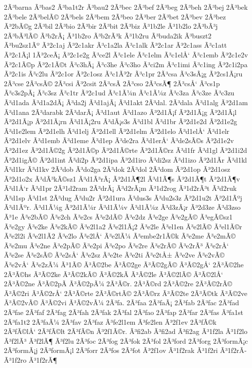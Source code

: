 {2Ã³barna
Ã³bas2
Ã³ba1t2r
Ã³bau2
2Ã³bec
2Ã³bef
2Ã³beg
2Ã³beh
2Ã³bej
2Ã³bek
2Ã³bele
2Ã³belÃ©
2Ã³bels
2Ã³bem
2Ã³beo
2Ã³ber
2Ã³bet
2Ã³bev
2Ã³bez
Ã³2bÃ©g
2Ã³bil
2Ã³bio
2Ã³bir
2Ã³bit
2Ã³biz
Ã³1b2le
Ã³1b2lo
2Ã³bÃ³j
2Ã³bÃ³lÃ©
Ã³b2rÃ¡
Ã³1b2ro
Ã³b2rÃ³k
Ã³1b2ru
Ã³buda2ik
Ã³buszt2
Ã³bu2sz1Ãº
Ã³2c1aj
Ã³2c1akr
Ã³c1a2la
Ã³c1alk
Ã³2c1ar
Ã³2c1ass
Ã³c1att
Ã³2c1Ã¡l
1Ã³2ceÃ¡
Ã³2c1e2g
Ã³ce2l
Ã³c1ele
Ã³c1elm
Ã³c1elÅ‘
Ã³c1emb
Ã³2c1e2v
Ã³2c1Ã©p
Ã³2c1Ã©t
Ã³c3hÃ¡
Ã³c3he
Ã³c3ho
Ã³ci2m
Ã³c1imi
Ã³c1ing
Ã³2c1i2pa
Ã³2c1is
Ã³c2lu
Ã³2c1or
Ã³2c1osz
Ã³c1Ã³2r
Ã³c1pr
2Ã³csa
Ã³c3sÃ¡g
Ã³2cs1Ã¡ru
2Ã³cse
2Ã³csÃ©
2Ã³csi
Ã³2csit
2Ã³csÃ­
2Ã³cso
2Ã³csÃ¶
2Ã³csÅ‘
Ã³cs1p
Ã³c3s2pÃ¡
Ã³c3sz
Ã³c1tr
Ã³2c1ud
Ã³c1Ã¼n
Ã³c1Ã¼z
Ã³c3za
Ã³c3ze
Ã³c3zu
Ã³d1ada
Ã³d1a2dÃ¡
Ã³da2j
Ã³d1ajÃ¡
Ã³d1akt
2Ã³dal.
2Ã³dala
Ã³d1alg
Ã³2d1am
Ã³d1ana
2Ã³darabk
2Ã³darÃ¡
Ã³d1aut
Ã³d1azo
Ã³2d1Ã¡f
Ã³2d1Ã¡g
Ã³2d1Ã¡l
Ã³2d1Ã¡p
Ã³2d1Ã¡rn
Ã³d1Ã¡2ru
Ã³dÃ¡s3s
Ã³d1bl
Ã³d1br
Ã³2d1e2d
Ã³2d1e2g
Ã³d1e2lem
Ã³2d1elh
Ã³d1elj
Ã³2d1ell
Ã³2d1elm
Ã³2d1elo
Ã³d1elÅ‘
Ã³d1elr
Ã³2d1elv
Ã³d1emb
Ã³d1eme
Ã³d1ep
Ã³de2ra
Ã³d1erÅ‘
Ã³de2sÃ©s
Ã³2d1e2v
Ã³2d1ez
Ã³2d1Ã©2g
Ã³2d1Ã©p
Ã³2d1Ã©rte
Ã³2d1Ã©rz
Ã³d1fr
Ã³d1gl
Ã³2d1i2d
Ã³2d1igÃ©
Ã³2d1int
Ã³di2p
Ã³2d1ipa
Ã³2d1iro
Ã³di2sz
Ã³d1izo
Ã³2d1Ã­r
Ã³d1kl
Ã³d1kr
Ã³d1kv
2Ã³dob
Ã³do2ga
2Ã³dok
2Ã³dol
2Ã³dom
Ã³2d1op
Ã³2d1osz
Ã³2d1o2x
Ã³dÃ³kÃ©sz1
Ã³d1Ã³rÃ¡
Ã³2d1Ã¶2l
Ã³d1Ã¶s
Ã³2d1Ã¶t
Ã³2d1Ã¶v
Ã³d1Å‘r
Ã³d1pr
2Ã³1d2ram
2Ã³drÃ¡
Ã³d2rÃ¡m
Ã³1d2rog
Ã³1d2rÃ³t
Ã³d2ruk
Ã³d1sp
Ã³d1st
2Ã³dug
Ã³du2r
Ã³2d1ura
Ã³dus3s
Ã³du2s3z
Ã³2d1u2t
Ã³2d1Ãºj
Ã³d1Ãºr.
Ã³d1Ã¼g
Ã³2d1Ã¼r
Ã³d1Ã¼v
Ã³d1Ã¼z
Ã³d3zÃ¡r
Ã³2d3ze
Ã³d3zso
Ã³1e
Ã³e2bÃ©
Ã³e2ch
Ã³e2cs
Ã³e2dÃ©
Ã³e2dz
Ã³e2ge
Ã³e2gÃ©
Ã³egÃ©sz1
Ã³e2gy
Ã³e2ke
Ã³e2kÃ©
Ã³e2l1a2
Ã³e2l1Ã¡2
Ã³e2le
Ã³el1en
Ã³e2lÃ©
Ã³el1Ã©r
Ã³e2l2i
Ã³e2l1Ã­2
Ã³e2lo
Ã³e2lÅ‘
Ã³e2lÃ¼
Ã³embe2r1Ã©k
Ã³e2me
Ã³e2mÃ©
Ã³e2mu
Ã³e2ne
Ã³e2pÃ©
Ã³e2pi
Ã³e2po
Ã³e2re
Ã³e2rÃ©
Ã³e2rÃ³
Ã³e2rÅ‘
Ã³e2se
Ã³e2sÃ©
Ã³e2sÅ‘
Ã³e2sz
Ã³e2te
Ã³e2ti
Ã³e2tÅ±
Ã³e2ve
Ã³e2vÃ©
Ã³e2vÅ‘
Ã³e2zÃ¼
Ã³1Ã©
Ã³Ã©2be
Ã³Ã©2ge
Ã³Ã©2gÃ©
Ã³Ã©2gÅ‘
2Ã³Ã©2he
2Ã³Ã©hs
Ã³Ã©2ke
Ã³Ã©2kÃ©
Ã³Ã©2kÃ­
Ã³Ã©2le
Ã³Ã©2lÃ©
Ã³Ã©2lÅ‘
2Ã³Ã©2ne
Ã³Ã©2pÃ­
Ã³Ã©2pÃ¼
2Ã³Ã©r.
2Ã³Ã©rd
2Ã³Ã©2re
2Ã³Ã©2rÃ©
Ã³Ã©2ri
Ã³Ã©2rÅ‘
2Ã³Ã©rte
2Ã³Ã©rtÃ©
2Ã³Ã©rz
Ã³Ã©2te
2Ã³Ã©tk
Ã³Ã©2ve
Ã³Ã©2vÃ©
Ã³Ã©2vi
Ã³Ã©2vÃ¼
2Ã³fa.
2Ã³faa
2Ã³faÃ¡
2Ã³fab
2Ã³fac
2Ã³fad
2Ã³fae
2Ã³faf
2Ã³fag
2Ã³fah
2Ã³fak
2Ã³fal
2Ã³fao
2Ã³fap
2Ã³far
2Ã³fas
Ã³fa1st
2Ã³fa1t2
2Ã³faÃ¼
2Ã³fav
2Ã³faz
Ã³fe2l1em
Ã³fe2len
Ã³2f1ev
2Ã³fÃ©k
2Ã³fÃ©lÅ‘
2Ã³fÃ©lt
2Ã³fÃ©n
Ã³2f1Ã©r.
Ã³fi2ab
Ã³fi2ad
Ã³fi2ag
Ã³1f2la
Ã³1f2lo
Ã³f2lÃ³
Ã³f2lÃ¶
Ã³f2lu
2Ã³foc
2Ã³fog
2Ã³fok
2Ã³fol
2Ã³ford
2Ã³forg
2Ã³formÃ¡c
2Ã³formÃ¡j
2Ã³formÃ¡l
2Ã³forr
2Ã³fos
2Ã³fot
Ã³2f1ov
Ã³1f2rak
Ã³1f2ri
Ã³1f2rÃ­
Ã³1f2ro
Ã³1f2rÃ¶
}
